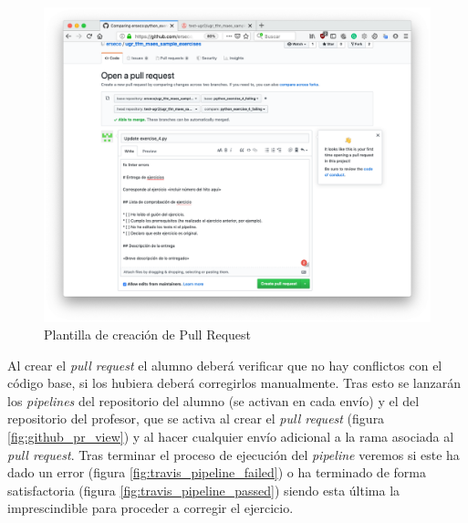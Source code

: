 \begin{figure}[h!]
\centering
\includegraphics[width=1.0\textwidth]{../images/github_pr_create}
\caption{Plantilla de creación de Pull Request}
\label{fig:github_pr_create}
\end{figure}

Al crear el \textit{pull request} el alumno deberá verificar que no hay conflictos con el código base, si los hubiera deberá corregirlos manualmente. Tras esto se lanzarán los \textit{pipelines} del repositorio del alumno (se activan en cada envío) y el del repositorio del profesor, que se activa al crear el \textit{pull request} (figura \ref{fig:github_pr_view}) y al hacer cualquier envío adicional a la rama asociada al \textit{pull request}. Tras terminar el proceso de ejecución del \textit{pipeline} veremos si este ha dado un error (figura \ref{fig:travis_pipeline_failed}) o ha terminado de forma satisfactoria (figura \ref{fig:travis_pipeline_passed}) siendo esta última la imprescindible para proceder a corregir el ejercicio.

